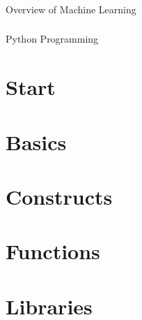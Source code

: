  \begin{frame}[fragile]\frametitle{}
 \begin{center}
 {\Large Overview of Machine Learning}
 \end{center}
 \end{frame}

 

 \begin{frame}[fragile]\frametitle{}
 \begin{center}
 {\Large Python Programming}
 \end{center}
 \end{frame}

 \section[Py Start]{Start}
 
 


\section[Basics]{Basics}



 
\section[Constructs]{Constructs}




 

 \section[Functions]{Functions}
 
 
 
  
 
 \section[Libs]{Libraries}
 
 
 


